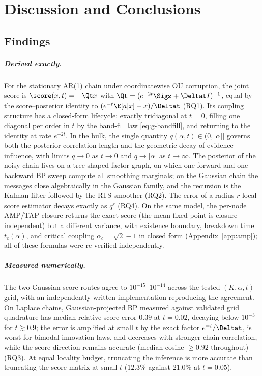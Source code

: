 \chapter{Discussion and Conclusions}\label{ch:conclusions}

\section{Findings}\label{sec:conclusions-findings}\label{sec:conclusions-amp}

\paragraph{Derived exactly.} For the stationary AR(1) chain under
coordinatewise OU corruption, the joint score is $\score(x,t) = -\Qt x$
with $\Qt = (e^{-2t}\Sigz + \Deltat I)^{-1}$, equal by the
score--posterior identity to $(e^{-t}\E[a|x] - x)/\Deltat$ (RQ1). Its
coupling structure has a closed-form lifecycle: exactly tridiagonal at
$t = 0$, filling one diagonal per order in $t$ by the band-fill law
\eqref{eq:g-bandfill}, and returning to the identity at rate $e^{-2t}$.
In the bulk, the single quantity $q(\alpha, t) \in (0, |\alpha|]$ governs
both the posterior correlation length and the geometric decay of evidence
influence, with limits $q \to 0$ as $t \to 0$ and $q \to |\alpha|$ as
$t \to \infty$. The posterior of the noisy chain lives on a tree-shaped
factor graph, on which one forward and one backward BP sweep compute all
smoothing marginals; on the Gaussian chain the messages close
algebraically in the Gaussian family, and the recursion is the Kalman
filter followed by the RTS smoother (RQ2). The
error of a radius-$r$ local score estimator decays exactly as $q^r$
(RQ4). On the same model, the per-node AMP/TAP closure returns the exact
score (the mean fixed point is closure-independent) but a different
variance, with existence boundary, breakdown time $t_c(\alpha)$, and
critical coupling $\alpha_c = \sqrt{2} - 1$ in closed form
(Appendix~\ref{app:amp}); all of these formulas were re-verified
independently.

\paragraph{Measured numerically.} The two Gaussian score routes agree to
$10^{-15}$--$10^{-14}$ across the tested $(K, \alpha, t)$ grid, with an
independently written implementation reproducing the agreement. On
Laplace chains, Gaussian-projected BP measured against validated grid
quadrature has median relative score error $0.39$ at $t = 0.02$,
decaying below $10^{-3}$ for $t \gtrsim 0.9$; the error is amplified at
small $t$ by the exact factor $e^{-t}/\Deltat$, is worst for bimodal
innovation laws, and decreases with stronger chain correlation, while
the score direction remains accurate (median cosine $\geq 0.92$
throughout) (RQ3). At equal locality budget, truncating the inference is
more accurate than truncating the score matrix at small $t$ ($12.3\%$
against $21.0\%$ at $t = 0.05$).

